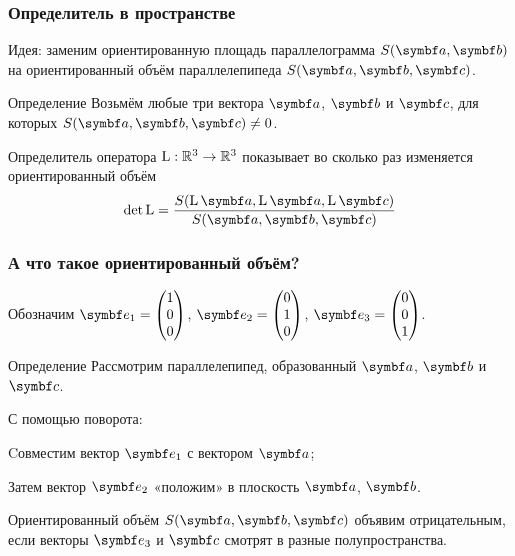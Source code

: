 \begin{frame}
    \frametitle{Определитель в пространстве}

    Идея: заменим ориентированную площадь параллелограмма $S(\ba, \bb)$ 
    на ориентированный объём параллелепипеда $S(\ba, \bb, \bc)$.
    
    \pause

\begin{block}{Определение}
    Возьмём любые три вектора $\ba$, $\bb$ и $\bc$, для которых $S(\ba, \bb, \bc)\neq 0$.

    \alert{Определитель} оператора $\operatorname{L}:\mathbb{R}^3 \to \mathbb{R}^3$ показывает во сколько раз изменяется
    ориентированный объём
    \[
    \det \LL = \frac{S(\LL\ba, \LL\ba, \LL\bc)}{S(\ba, \bb, \bc)}    
    \]
\end{block} 


\end{frame}



\begin{frame}
    \frametitle{А что такое ориентированный объём?}

\pause 

Обозначим $\be_1 = \begin{pmatrix}
    1 \\
    0 \\
    0 \\
\end{pmatrix}$, $\be_2 = \begin{pmatrix}
    0 \\
    1 \\
    0
\end{pmatrix}$, $\be_3 = \begin{pmatrix}
    0 \\
    0 \\
    1 \\
\end{pmatrix}$.



\pause

\begin{block}{Определение}
    Рассмотрим параллелепипед, образованный $\ba$, $\bb$ и $\bc$.

    \pause

    С помощью поворота: 

    Cовместим вектор $\be_1$ с вектором $\ba$;

    Затем вектор $\be_2$ «положим» в плоскость $\ba$, $\bb$.

    \pause

    \alert{Ориентированный объём} $S(\ba, \bb, \bc)$ объявим отрицательным,
    если векторы $\be_3$ и $\bc$ смотрят в разные полупространства.
    
\end{block}


\end{frame}


